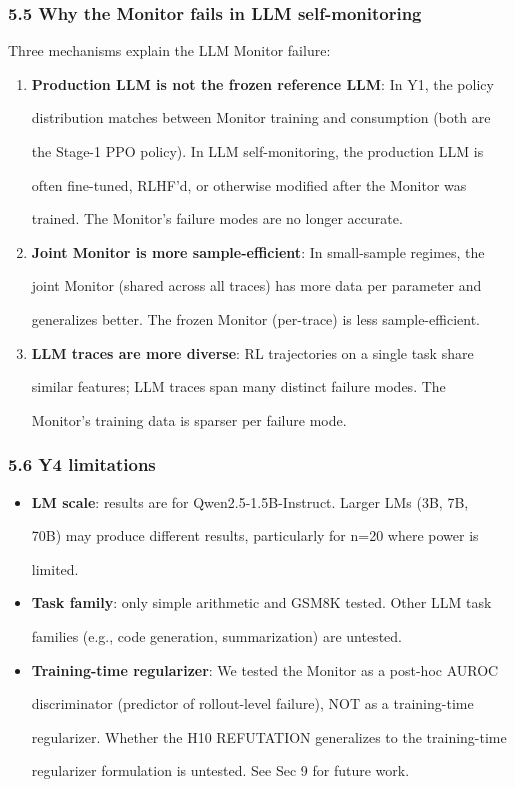 \documentclass[11pt]{article}
\begin{document}
\subsubsection{5.5 Why the Monitor fails in LLM
self-monitoring}\label{why-the-monitor-fails-in-llm-self-monitoring}

Three mechanisms explain the LLM Monitor failure:

\begin{enumerate}
\def\labelenumi{\arabic{enumi}.}
\item
  \textbf{Production LLM is not the frozen reference LLM}: In Y1, the
  policy

  distribution matches between Monitor training and consumption (both
  are

  the Stage-1 PPO policy). In LLM self-monitoring, the production LLM is

  often fine-tuned, RLHF'd, or otherwise modified after the Monitor was

  trained. The Monitor's failure modes are no longer accurate.
\item
  \textbf{Joint Monitor is more sample-efficient}: In small-sample
  regimes, the

  joint Monitor (shared across all traces) has more data per parameter
  and

  generalizes better. The frozen Monitor (per-trace) is less
  sample-efficient.
\item
  \textbf{LLM traces are more diverse}: RL trajectories on a single task
  share

  similar features; LLM traces span many distinct failure modes. The

  Monitor's training data is sparser per failure mode.
\end{enumerate}

\subsubsection{5.6 Y4 limitations}\label{y4-limitations}

\begin{itemize}
\item
  \textbf{LM scale}: results are for Qwen2.5-1.5B-Instruct. Larger LMs
  (3B, 7B,

  70B) may produce different results, particularly for n=20 where power
  is

  limited.
\item
  \textbf{Task family}: only simple arithmetic and GSM8K tested. Other
  LLM task

  families (e.g., code generation, summarization) are untested.
\item
  \textbf{Training-time regularizer}: We tested the Monitor as a
  post-hoc AUROC

  discriminator (predictor of rollout-level failure), NOT as a
  training-time

  regularizer. Whether the H10 REFUTATION generalizes to the
  training-time

  regularizer formulation is untested. See Sec 9 for future work.
\end{itemize}
\end{document}
